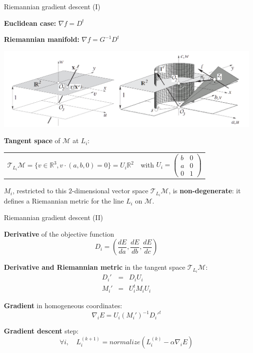 \begin{frame}[c]{Riemannian gradient descent (I)}
	\scriptsize
	
	\begin{minipage}[t]{0.5\linewidth}
		\textbf{Euclidean case:} $\nabla f = D^{t}$
	\end{minipage}%
	\pause%
	\begin{minipage}[t]{0.5\linewidth}
		\centering
 		\textbf{Riemannian manifold:} $\nabla f = G^{-1} D^t$
	\end{minipage}%
	
	\begin{center}
	\includegraphics[width=0.5\linewidth]{euclidean_normalization}
	\end{center}

	\textbf{Tangent space} of $\mathcal{M}$ at $L_i$:
	\begin{tabular}{cc}
		$ \mathcal{T}_{L_i} \mathcal{M} = \{ v \in \mathbb{R}^3, v \cdot (a,b, 0) = 0 \} = U_i \mathbb{R}^2 $
		& with $U_i = \begin{pmatrix} b & 0 \\ a & 0 \\ 0 & 1 \end{pmatrix}$
	\end{tabular}

	$M_i$, restricted to this $2$-dimensional vector space $\mathcal{T}_{L_i} \mathcal{M}$, is \textbf{non-degenerate}: it defines a Riemannian metric for the line $L_i$ on $\mathcal{M}$.
\end{frame}

\begin{frame}[c]{Riemannian gradient descent (II)}
	\small
		
	\textbf{Derivative} of the objective function
	\[ D_i = \left( \frac{dE }{da},  \frac{dE }{db}, \frac{dE }{dc} \right) \]	
	
	\textbf{Derivative and Riemannian metric} in the tangent space $\mathcal{T}_{L_i} \mathcal{M}$:
	\begin{eqnarray*}
		D_i' &=& D_i U_i \\
		M_i' &=& U_i^t  M_i U_i
	\end{eqnarray*}
	
	\textbf{Gradient} in homogeneous coordinates:
	\[
	\nabla_i E = U_i (M_i')^{-1} {D_i'}^t
	\]
	
	\textbf{Gradient descent} step:
	\[
	\forall i,  \quad L_i^{(k+1)} = normalize\left(  L_i^{(k)} - \alpha \nabla_i E   \right) 
	\]
\end{frame}

